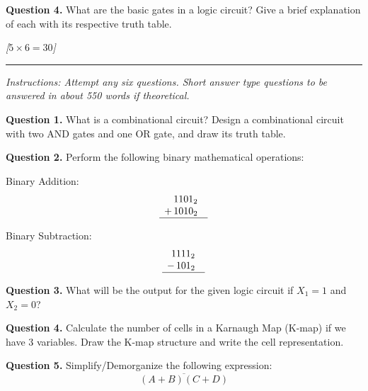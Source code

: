 \documentclass[11pt,a4paper]{article}
\newcommand{\pts}[1]{\hfill   \textit{[#1]}}
\begin{document}
\medskip


\noindent   \textbf{Question 4.} What are the basic gates in a logic circuit? Give a brief explanation of each with its respective truth table.

\bigskip


\pts{$5  \times 6 = 30$}
\rule{\linewidth}{0.4pt}\smallskip




\noindent   \textit{Instructions: Attempt any six questions. Short answer type questions to be answered in about 550 words if theoretical.}

\medskip


\noindent   \textbf{Question 1.} What is a combinational circuit? Design a combinational circuit with two AND gates and one OR gate, and draw its truth table.

\medskip


\noindent   \textbf{Question 2.} Perform the following binary mathematical operations:

\begin{parts}
  \item Binary Addition:
    \[
    
\begin{array}{r@{\quad}l}
      1101_2 \\
    + \, 1010_2 \\
    \hline
    \end{array}
    \]
  \item Binary Subtraction:
    \[
    
\begin{array}{r@{\quad}l}
      1111_2 \\
    - \, 101_2 \\
    \hline
    \end{array}
    \]
\end{parts}

\medskip


\noindent   \textbf{Question 3.} What will be the output for the given logic circuit if $X_1 = 1$ and $X_2 = 0$?

\medskip


\noindent   \textbf{Question 4.} Calculate the number of cells in a Karnaugh Map (K-map) if we have 3 variables. Draw the K-map structure and write the cell representation.

\medskip


\noindent   \textbf{Question 5.} Simplify/Demorganize the following expression:
\[
\overline{(A+B)(C+D)}
\]
\end{document}
